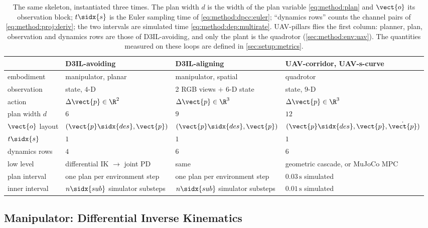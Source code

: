 \begin{table}[htpb]
  \caption[Embodiment instantiation]{The same skeleton, instantiated three times. The plan width $d$
  is the width of the plan variable \eqref{eq:method:plan} and $\vect{o}$ its observation block;
  $t\sidx{s}$ is the Euler sampling time of \eqref{eq:method:dpcc:euler}; ``dynamics rows'' counts the
  channel pairs of \eqref{eq:method:proj:deriv}; the two intervals are simulated time
  \eqref{eq:method:dep:multirate}. UAV-pillars flies the first column: planner, plan, observation and
  dynamics rows are those of D3IL-avoiding, and only the plant is the quadrotor
  (\autoref{sec:method:env:uav}). The quantities measured on these loops are defined in
  \autoref{sec:setup:metrics}.}
  \label{tab:embodiments}
  \centering\small
  \begin{tabularx}{\linewidth}{lLLL}
    \toprule
     & D3IL-avoiding & D3IL-aligning & UAV-corridor, UAV-s-curve \\
    \midrule
    embodiment      & manipulator, planar   & manipulator, spatial      & quadrotor \\
    observation     & state, $4$-D          & 2 RGB views $+$ $6$-D state & state, $9$-D \\
    action          & $\Delta\vect{p}\in\R^{2}$ & $\Delta\vect{p}\in\R^{3}$ & $\Delta\vect{p}\in\R^{3}$ \\
    plan width $d$  & $6$                   & $9$                       & $12$ \\
    $\vect{o}$ layout & $(\vect{p}\sidx{des},\vect{p})$ & $(\vect{p}\sidx{des},\vect{p})$ & $(\vect{p}\sidx{des},\vect{p},\dot{\vect{p}})$ \\
    $t\sidx{s}$     & $1$                   & $1$                       & $1$ \\
    dynamics rows   & $4$                   & $6$                       & $6$ \\
    low level       & differential \ac{IK} $\rightarrow$ joint PD & same & geometric cascade, or MuJoCo MPC \\
    plan interval   & one plan per environment step & one plan per environment step & $0.03\,\textrm{s}$ simulated \\
    inner interval  & $n\sidx{sub}$ simulator substeps & $n\sidx{sub}$ simulator substeps & $0.01\,\textrm{s}$ simulated \\
    \bottomrule
  \end{tabularx}
\end{table}

\subsection{Manipulator: Differential Inverse Kinematics}\label{sec:method:ik}

